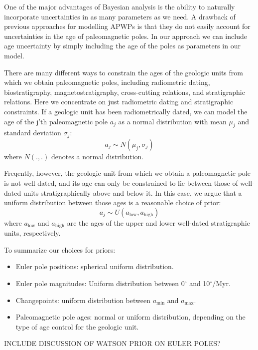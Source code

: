 \documentclass[preprint,12pt,authoryear]{elsarticle}
\begin{document}
One of the major advantages of Bayesian analysis is the ability to naturally incorporate
uncertainties in as many parameters as we need. A drawback of previous approaches
for modelling APWPs is that they do not easily account for uncertainties in
the age of paleomagnetic poles. In our approach we can include age uncertainty
by simply including the age of the poles as parameters in our model.

There are many different ways to constrain the ages of the geologic units from
which we obtain paleomagnetic poles, including radiometric dating, biostratigraphy,
magnetostratigraphy, cross-cutting relations, and stratigraphic relations.
Here we concentrate on just radiometric dating and stratigraphic constraints.
If a geologic unit has been radiometrically dated, we can model the age of
the j'th paleomagnetic pole $a_j$ as a normal distribution with mean $\mu_j$ and standard deviation $\sigma_j$:
\begin{equation}
a_j \sim N(\mu_j, \sigma_j)
\end{equation}
where $N(.,.)$ denotes a normal distribution.

Freqently, however, the geologic unit from which we obtain a paleomagnetic pole
is not well dated, and its age can only be constrained to lie between those
of well-dated units stratigraphically above and below it. In this case,
we argue that a uniform distribution between those ages is a reasonable choice
of prior:
\begin{equation}
a_j \sim U(a_\mathrm{low}, a_\mathrm{high})
\end{equation}
where $a_\mathrm{low}$ and $a_\mathrm{high}$ are the ages of the upper and lower
well-dated stratigraphic units, respectively.

To summarize our choices for priors:
\begin{itemize}
\item Euler pole positions: spherical uniform distribution.
\item Euler pole magnitudes: Uniform distribution between 0$^\circ$ and 10$^\circ$/Myr.
\item Changepoints: uniform distribution between $a_\mathrm{min}$ and $a_\mathrm{max}$.
\item Paleomagnetic pole ages: normal or uniform distribution, depending on the type of age control for the geologic unit.
\end{itemize}


INCLUDE DISCUSSION OF WATSON PRIOR ON EULER POLES?
\end{document}
